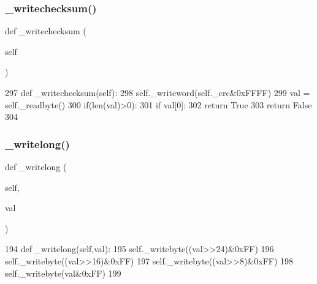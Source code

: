 \subsubsection{\texorpdfstring{\+\_\+writechecksum()}{\_writechecksum()}}
{\footnotesize\ttfamily def \+\_\+writechecksum (\begin{DoxyParamCaption}\item[{}]{self }\end{DoxyParamCaption})\hspace{0.3cm}{\ttfamily [private]}}


\begin{DoxyCode}
297     \textcolor{keyword}{def }\_writechecksum(self):
298         self.\_writeword(self.\_crc&0xFFFF)
299         val = self.\_readbyte()
300         if(len(val)>0):
301             \textcolor{keywordflow}{if} val[0]:
302                 \textcolor{keywordflow}{return} \textcolor{keyword}{True}
303         \textcolor{keywordflow}{return} \textcolor{keyword}{False}
304 
\end{DoxyCode}
\mbox{\label{classtoxic__hardware_1_1roboclaw__3_1_1Roboclaw_a2f43b35acbde35e3d8584dcc5ca878d3}} 
\subsubsection{\texorpdfstring{\+\_\+writelong()}{\_writelong()}}
{\footnotesize\ttfamily def \+\_\+writelong (\begin{DoxyParamCaption}\item[{}]{self,  }\item[{}]{val }\end{DoxyParamCaption})\hspace{0.3cm}{\ttfamily [private]}}


\begin{DoxyCode}
194     \textcolor{keyword}{def }\_writelong(self,val):
195         self.\_writebyte((val>>24)&0xFF)
196         self.\_writebyte((val>>16)&0xFF)
197         self.\_writebyte((val>>8)&0xFF)
198         self.\_writebyte(val&0xFF)
199 
\end{DoxyCode}
\mbox{\label{classtoxic__hardware_1_1roboclaw__3_1_1Roboclaw_a33f4f881d630c20a3ba1e023dd2251e9}} 
